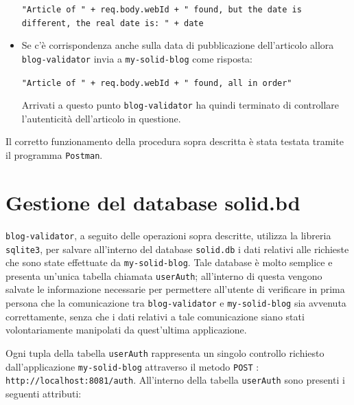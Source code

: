\begin{itemize}
	\smallskip
	
	{\tt "Article of " + req.body.webId + " found, but the date is different, the real date is: " + date}
	\item Se c'è corrispondenza anche sulla data di pubblicazione dell'articolo allora {\tt blog-validator} invia a {\tt my-solid-blog} come risposta:
	
	\smallskip
	
	{\tt "Article of " + req.body.webId + " found, all in order"}
	
	\smallskip
	
	Arrivati a questo punto {\tt blog-validator} ha quindi terminato di controllare l'autenticità dell'articolo in questione.	
\end{itemize}

\medskip

Il corretto funzionamento della procedura sopra descritta è stata testata tramite il programma {\tt Postman}.

\bigskip

\section{Gestione del database solid.bd}

\medskip

{\tt blog-validator}, a seguito delle operazioni sopra descritte, utilizza la libreria {\tt sqlite3}, per salvare all'interno del database {\tt solid.db} i dati relativi alle richieste che sono state effettuate da {\tt my-solid-blog}. Tale database è molto semplice e presenta un'unica tabella chiamata {\tt userAuth}; all'interno di questa vengono salvate le informazione necessarie per permettere all'utente di verificare in prima persona che la comunicazione tra {\tt blog-validator} e {\tt my-solid-blog} sia avvenuta correttamente, senza che i dati relativi a tale comunicazione siano stati volontariamente manipolati da quest'ultima applicazione.

\bigskip

Ogni tupla della tabella {\tt userAuth} rappresenta un singolo controllo richiesto dall'applicazione {\tt my-solid-blog} attraverso il metodo {\tt POST} : {\tt http://localhost:8081/auth}. All'interno della tabella {\tt userAuth} sono presenti i seguenti attributi:

